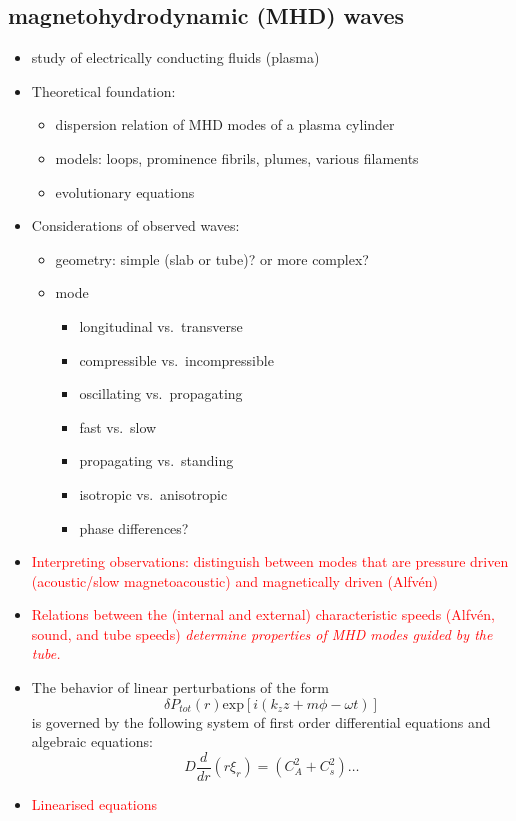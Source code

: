 \documentclass{article}
\begin{document}
\subsection{magnetohydrodynamic (MHD) waves}
\begin{itemize}
    \item study of electrically conducting fluids (plasma)
    \item Theoretical foundation:
        \begin{itemize}
            \item dispersion relation of MHD modes of a plasma cylinder
            \item models: loops, prominence fibrils, plumes, various filaments
            \item evolutionary equations
        \end{itemize}
    \item Considerations of observed waves:
        \begin{itemize}
            \item geometry: simple (slab or tube)? or more complex?
            \item mode
                \begin{itemize}
                    \item longitudinal vs.\ transverse
                    \item compressible vs.\ incompressible
                    \item oscillating vs.\ propagating
                    \item fast vs.\ slow
                    \item propagating vs.\ standing
                    \item isotropic vs.\ anisotropic
                    \item phase differences?
                \end{itemize}
        \end{itemize}
    \item \textcolor{red}{Interpreting observations: distinguish between modes
        that are pressure driven (acoustic/slow magnetoacoustic)
        and magnetically driven (Alfv\'en)}
    \item \textcolor{red}{Relations between the (internal and external)
        characteristic speeds (Alfv\'en, sound, and tube speeds)
        \emph{determine properties of MHD modes guided by the tube.}}
    \item The behavior of linear perturbations of the form
        $$ \delta P_{tot}(r)\textrm{exp}\left[i(k_zz+m\phi-\omega t)\right]  $$
        is governed by  the following system of first order differential
        equations and algebraic equations:
        $$ D\frac{d}{dr}(r\xi_r) = (C_A^2+C_s^2)\ldots  $$
    \item \textcolor{red}{Linearised equations}


\end{itemize}
\end{document}
